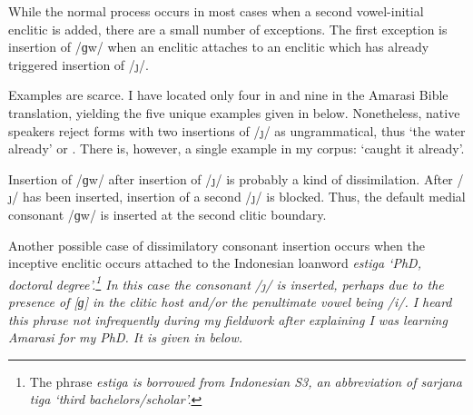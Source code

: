 While the normal process occurs in most cases
when a second vowel-initial enclitic is added,
there are a small number of exceptions.
The first exception is insertion of /ɡw/
when an enclitic attaches to an enclitic which has
already triggered insertion of /\j/.

Examples are scarce.
I have located only four in \citet{or16c} and nine
in the Amarasi Bible translation,
yielding the five unique examples given in  below.
Nonetheless, native speakers reject forms with two insertions of /\j/ as ungrammatical, thus
 `the water already' or .
There is, however, a single example in my corpus:  `caught it already'.

\begin{exe}
\end{exe}

Insertion of /ɡw/ after insertion of /\j/ is probably a kind of dissimilation.
After /\j/ has been inserted, insertion of a second /\j/ is blocked.
Thus, the default medial consonant /ɡw/ is inserted at the second clitic boundary.

Another possible case of dissimilatory consonant insertion occurs
when the inceptive enclitic  occurs attached
to the Indonesian loanword \it{estiga} `PhD, doctoral degree'.\footnote{
		The phrase \it{estiga} is borrowed from Indonesian S3,
		an abbreviation of \it{sarjana tiga} `third bachelors/scholar'.}
In this case the consonant /\j/ is inserted,
perhaps due to the presence of [ɡ] in the clitic host
and/or the penultimate vowel being /i/.
I heard this phrase not infrequently during my fieldwork
after explaining I was learning Amarasi for my PhD.
It is given in  below.

